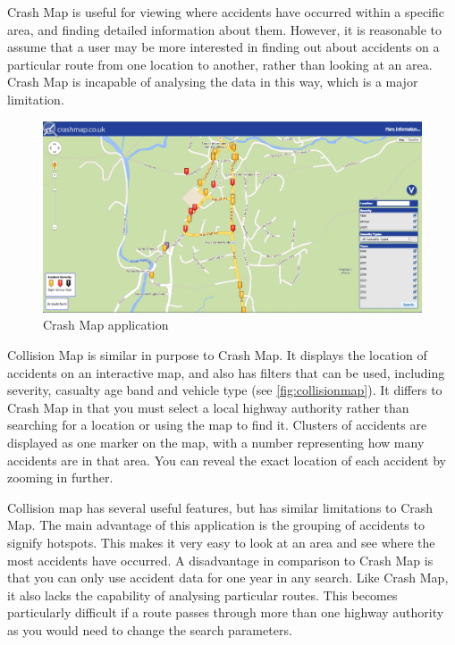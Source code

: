 \documentclass[authoryearcitations]{UoYCSproject}
\begin{document}
Crash Map is useful for viewing where accidents have occurred within a specific area, and finding detailed information about them. However, it is reasonable to assume that a user may be more interested in finding out about accidents on a particular route from one location to another, rather than looking at an area. Crash Map is incapable of analysing the data in this way, which is a major limitation.

\begin{figure}
	\center
	\includegraphics[scale=0.25]{crashmap}
	\caption{Crash Map application}
	\label{fig:crashmap}
\end{figure}

Collision Map \citep{DepartmentforTransport} is similar in purpose to Crash Map. It displays the location of accidents on an interactive map, and also has filters that can be used, including severity, casualty age band and vehicle type (see \autoref{fig:collisionmap}). It differs to Crash Map in that you must select a local highway authority rather than searching for a location or using the map to find it. Clusters of accidents are displayed as one marker on the map, with a number representing how many accidents are in that area. You can reveal the exact location of each accident by zooming in further.

Collision map has several useful features, but has similar limitations to Crash Map. The main advantage of this application is the grouping of accidents to signify hotspots. This makes it very easy to look at an area and see where the most accidents have occurred. A disadvantage in comparison to Crash Map is that you can only use accident data for one year in any search. Like Crash Map, it also lacks the capability of analysing particular routes. This becomes particularly difficult if a route passes through more than one highway authority as you would need to change the search parameters. 
\end{document}
